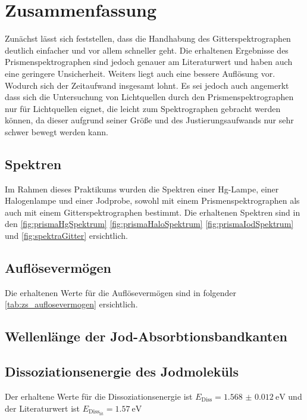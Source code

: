 \documentclass[12pt,english,ngerman]{scrartcl}
\begin{document}
\section{Zusammenfassung}\label{sec:zs}
Zunächst lässt sich feststellen, dass die Handhabung des Gitterspektrographen
deutlich einfacher und vor allem schneller geht. Die erhaltenen Ergebnisse des
Prismenspektrographen sind jedoch genauer am Literaturwert und haben auch eine
geringere Unsicherheit. Weiters liegt auch eine bessere Auflösung vor. Wodurch
sich der Zeitaufwand insgesamt lohnt. Es sei jedoch auch angemerkt dass sich
die Untersuchung von Lichtquellen durch den Prismenspektrographen nur für
Lichtquellen eignet, die leicht zum Spektrographen gebracht werden können, da
dieser aufgrund seiner Größe und des Justierungsaufwands nur sehr schwer bewegt
werden kann.

\subsection{Spektren}

Im Rahmen dieses Praktikums wurden die Spektren einer Hg-Lampe, einer
Halogenlampe und einer Jodprobe, sowohl mit einem Prismenspektrographen als
auch mit einem Gitterspektrographen bestimmt. Die erhaltenen Spektren sind in
den \autoref{fig:prismaHgSpektrum} \autoref{fig:prismaHaloSpektrum}
\autoref{fig:prismaIodSpektrum} und \autoref{fig:spektraGitter} ersichtlich.

\subsection{Auflösevermögen}

Die erhaltenen Werte für die Auflösevermögen sind in folgender
\autoref{tab:zs_auflosevermogen} ersichtlich.

\subsection{Wellenlänge der Jod-Absorbtionsbandkanten}


\subsection{Dissoziationsenergie des Jodmoleküls}

Der erhaltene Werte für die Dissoziationsenergie ist $E_\text{Diss} =
	\SI{1.568(12)}{\electronvolt}$ und der Literaturwert ist
$E_{\text{Diss}_\text{lit}} = \SI{1.57}{\electronvolt}$
\end{document}
